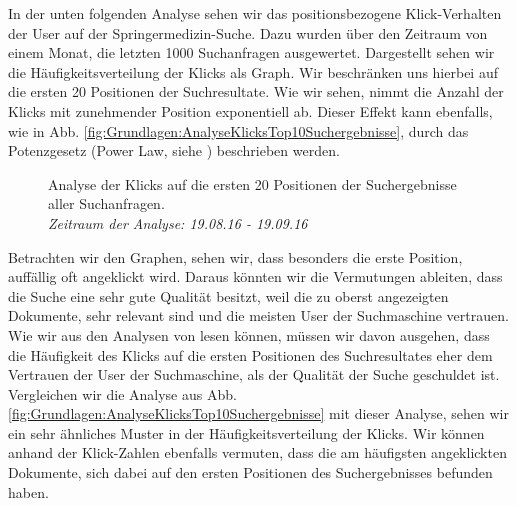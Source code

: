 
In der unten folgenden Analyse sehen wir das positionsbezogene Klick-Verhalten der User auf der Springermedizin-Suche. Dazu wurden über den Zeitraum von einem Monat, die letzten 1000 Suchanfragen ausgewertet. Dargestellt sehen wir die Häufigkeitsverteilung der Klicks als Graph. Wir beschränken uns hierbei auf die ersten 20 Positionen der Suchresultate. Wie wir sehen, nimmt die Anzahl der Klicks mit zunehmender Position exponentiell ab. Dieser Effekt kann ebenfalls, wie in Abb. \ref{fig:Grundlagen:AnalyseKlicksTop10Suchergebnisse}, durch das Potenzgesetz (Power Law, siehe \cite{PowerLaw}) beschrieben werden. 

\begin{figure}[H]
\centering 
\vspace{-1em}
\caption[Analyse der Klicks auf die ersten 20 Positionen der Suchergebnisse aller Suchanfragen. \textit{Zeitraum der Analyse: 19.08.16 - 19.09.16}]{Analyse der Klicks auf die ersten 20 Positionen der Suchergebnisse aller Suchanfragen. \\ \textit{Zeitraum der Analyse: 19.08.16 - 19.09.16}}
\label{fig:Grundlage:AnalyseKlicksPositionen}

\topRanks
  

\vspace{-2em}
\end{figure}

Betrachten wir den Graphen, sehen wir, dass besonders die erste Position, auffällig oft angeklickt wird. Daraus könnten wir die Vermutungen ableiten, dass die Suche eine sehr gute Qualität besitzt, weil die zu oberst angezeigten Dokumente, sehr relevant sind und die meisten User der Suchmaschine vertrauen. Wie wir aus den Analysen von \cite{Joachims} lesen können, müssen wir davon ausgehen, dass die Häufigkeit des Klicks auf die ersten Positionen des Suchresultates eher dem Vertrauen der User der Suchmaschine, als der Qualität der Suche geschuldet ist. Vergleichen wir die Analyse aus Abb. \ref{fig:Grundlagen:AnalyseKlicksTop10Suchergebnisse} mit dieser Analyse, sehen wir ein sehr ähnliches Muster in der Häufigkeitsverteilung der Klicks. Wir können anhand der Klick-Zahlen ebenfalls vermuten, dass die am häufigsten angeklickten Dokumente, sich dabei auf den ersten Positionen des Suchergebnisses befunden haben.